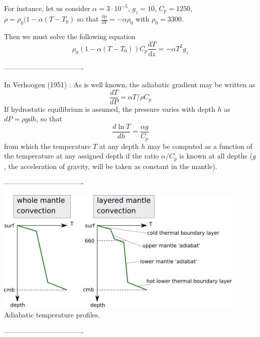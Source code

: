 For instance, let us consider $\alpha=3\cdot 10^{-5}$, 
$g_z=10$, $C_p=1250$, $\rho=\rho_0(1-\alpha (T-T_0)$ so that 
$\frac{\partial\rho}{\partial T} = -\alpha \rho_0$ 
with $\rho_0=3300$.

Then we must solve the following equation
\[
\rho_0(1-\alpha(T-T_0)) C_p \frac{\textrm{d}T}{\textrm{d}z} 
=
- \alpha T^2  g_z
\]

----------------------------------

In Verhoogen (1951) \cite{verh51}:
As is well known, the adiabatic gradient may be written as
\[
\frac{dT}{dP} = \alpha T /\rho C_p
\]
If hydrostatic equilibrium is assumed, the pressure varies with depth $h$ as 
$dP = \rho g dh$, so that
\[
\frac{d \ln T}{dh} = \frac{\alpha g}{C_p}
\]
from which the temperature $T$ at any depth $h$ may be computed as a function of the temperature
at any assigned depth if the ratio $\alpha/C_p$ 
is known at all depths ($g$, the acceleration of gravity, will
be taken as constant in the mantle).

----------------------------------
\begin{center}
\includegraphics[width=12cm]{images/adiabatic/drawing.png}
{\captionfont Adiabatic temperature profiles.}
\end{center}

----------------------------------


